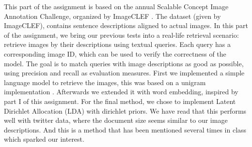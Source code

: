 This part of the assignment is based on the annual Scalable Concept Image Annotation Challenge, organized by ImageCLEF \cite{imageclef}. The dataset (given by ImageCLEF), contains sentence descriptions aligned to actual images. In this part of the assignment, we bring our previous tests into a real-life retrieval scenario: retrieve images by their descriptions using textual queries. Each query has a corresponding image ID, which can be used to verify the correctness of the model. The goal is to match queries with image descriptions as good as possible, using precision and recall as evaluation measures.
\newline
\newline
First we implemented a simple language model to retrieve the images, this was based on a unigram implementation \cite{languagemodelsforinformationretrieval}. Afterwards we extended it with word embedding, inspired by part I of this assignment. For the final method, we chose to implement Latent Dirichlet Allocation (LDA) with dirichlet priors. We have read that this performs well with twitter data, where the document size seems similar to our image descriptions. And this is a method that has been mentioned several times in class which sparked our interest. 
